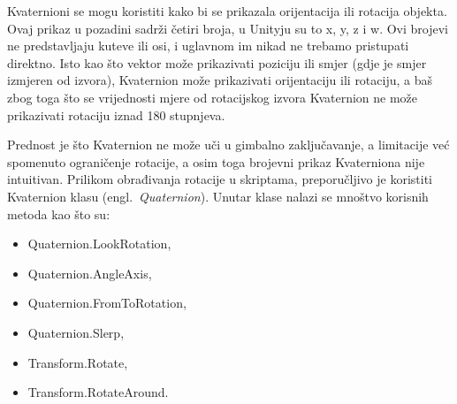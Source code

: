 Kvaternioni se mogu koristiti kako bi se prikazala orijentacija ili rotacija objekta. Ovaj prikaz u pozadini sadrži četiri broja, u Unityju su to x, y, z i w. Ovi brojevi ne predstavljaju kuteve ili osi, i uglavnom im nikad ne trebamo pristupati direktno. Isto kao što vektor može prikazivati poziciju ili smjer (gdje je smjer izmjeren od izvora), Kvaternion može prikazivati orijentaciju ili rotaciju, a baš zbog toga što se vrijednosti mjere od rotacijskog izvora Kvaternion ne može prikazivati rotaciju iznad 180 stupnjeva.

Prednost je što Kvaternion ne može uči u gimbalno zaključavanje, a limitacije već spomenuto ograničenje rotacije, a osim toga brojevni prikaz Kvaterniona nije intuitivan.
Prilikom obrađivanja rotacije u skriptama, preporučljivo je koristiti Kvaternion klasu (engl.~\textit{Quaternion}). Unutar klase nalazi se mnoštvo korisnih metoda kao što su:
\begin{itemize}
  \item Quaternion.LookRotation,
  \item Quaternion.AngleAxis,
  \item Quaternion.FromToRotation,
  \item Quaternion.Slerp,
  \item Transform.Rotate,
  \item Transform.RotateAround.
\end{itemize}

